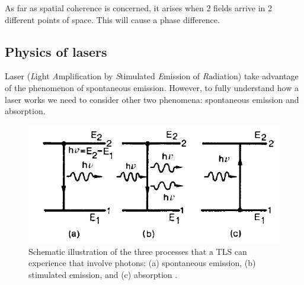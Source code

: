 \documentclass[11pt,a4paper]{article}
\begin{document}
As far as spatial coherence is concerned, it arises when 2 fields arrive in 2 different points of space. This will cause a phase difference.

\subsection{Physics of lasers}

Laser (\emph{L}ight \emph{A}mplification by \emph{S}timulated \emph{E}mission of \emph{R}adiation) take advantage of the phenomenon of spontaneous emission. However, to fully understand how a laser works we need to consider other two phenomena: spontaneous emission and absorption.

\begin{figure}[ht]
\centering
\includegraphics[width=.7\textwidth]{TLS}
\caption{Schematic illustration of the three processes that a TLS can experience that involve photons: (a) spontaneous emission, (b) stimulated emission, and (c) absorption \cite{svelto2010principles}.}
\label{fig:2LS}
\end{figure}
\end{document}

